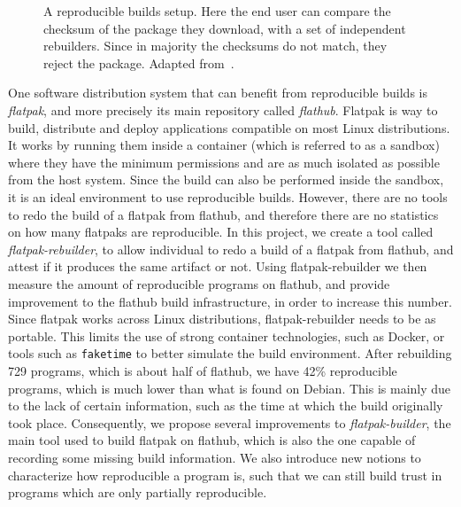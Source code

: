 \documentclass[a4paper,11pt,oneside]{report}
\theoremstyle{definition}
\newcommand{\sysname}{flatpak-rebuilder\xspace}
\newcommand{\rb}{reproducible builds\xspace}
\newcommand{\fp}{flatpak\xspace}
\newcommand{\Fp}{Flatpak\xspace}
\newcommand{\fh}{flathub\xspace}
\newcommand{\fb}{flatpak-builder\xspace}
\begin{document}
\begin{figure}[h]
    \caption{A reproducible builds setup. Here the end user can compare the
    checksum of the package they download, with a set of independent
    rebuilders. Since in majority the checksums do not match, they reject the
    package. Adapted from~\cite{DBLP:journals/corr/abs-2104-06020}.}
    \label{fig:reprobuild}
\end{figure}

One software distribution system that can benefit from \rb is \emph{\fp}, and
more precisely its main repository called \emph{\fh}. \Fp is way to build,
distribute and deploy applications compatible on most Linux distributions. It
works by running them inside a container (which is referred to as a sandbox)
where they have the minimum permissions and are as much isolated as possible
from the host system. Since the build can also be performed inside the sandbox,
it is an ideal environment to use \rb. However, there are no tools to redo the
build of a \fp from \fh, and therefore there are no statistics on how many
flatpaks are reproducible. In this project, we create a tool called
\emph{\sysname}, to allow individual to redo a build of a \fp from \fh, and
attest if it produces the same artifact or not. Using \sysname we then measure
the amount of reproducible programs on \fh, and provide improvement to the \fh
build infrastructure, in order to increase this number. Since \fp works across
Linux distributions, \sysname needs to be as portable. This limits the use of
strong container technologies, such as Docker, or tools such as \verb|faketime|
to better simulate the build environment.
After rebuilding 729 programs, which is about half of \fh, we have 42\%
reproducible programs, which is much lower than what is found on Debian. This
is mainly due to the lack of certain information, such as the time at which the
build originally took place. Consequently, we propose several improvements to
\emph{\fb}, the main tool used to build \fp on \fh, which is also the one
capable of recording some missing build information. We also introduce new
notions to characterize how reproducible a program is, such that we can still
build trust in programs which are only partially reproducible.
\end{document}
